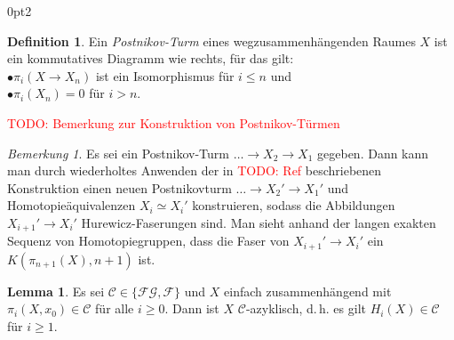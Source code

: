 \documentclass[11pt, a4paper, german]{article}
\theoremstyle{definition}
\newtheorem{lem}{Lemma}
\newtheorem{defn}{Definition}
\theoremstyle{remark}
\newtheorem*{bem}{Bemerkung}
\newcommand{\TODO}[1]{\textcolor{red}{TODO: #1}} %
\newcommand{\SC}{\mathcal{C}} %
\newcommand{\FG}{\mathcal{FG}} %
\newcommand{\F}{\mathcal{F}} %
\renewcommand{\dh}{d.\,h.} %
\newenvironment{centertikzcd}
  {\begin{center}\begin{tikzcd}}
  {\end{tikzcd}\end{center}}
\begin{document}
\renewcommand\windowpagestuff{
  \iffalse
  \begin{centertikzcd}[ampersand replacement=\&, column sep=0.5cm, row sep=0.2cm]
    \& \vdots \arrow[d] \\
    \& X_3 \arrow[d] \\
    \& X_2 \arrow[d] \\
    X \arrow[r] \arrow[ru] \arrow[ruu] \& X_1
  \end{centertikzcd}
  \fi
  \vspace{1cm}
  \begin{centertikzcd}[ampersand replacement=\&, column sep=0.2cm, row sep=0.5cm]
    \&\&\& X \arrow[dll] \arrow[dl] \arrow[d] \\
    \dots \arrow[r] \&
    X_3 \arrow[r] \&
    X_2 \arrow[r] \&
    X_1
  \end{centertikzcd}
}
\opencutright
\begin{cutout}{0}{\dimexpr\linewidth-4.5cm\relax}{0pt}{2}
  \begin{defn}
    Ein \emph{Postnikov-Turm} eines wegzusammenhängenden Raumes $X$ ist ein kommutatives Diagramm wie rechts, für das gilt: \\[3pt]
    \quad$\bullet$\enspace $\pi_i(X \to X_n)$ ist ein Isomorphismus für $i \leq n$ und \\
    \quad$\bullet$\enspace $\pi_i(X_n) = 0$ für $i > n$.
  \end{defn}
\end{cutout}

\TODO{Bemerkung zur Konstruktion von Postnikov-Türmen}

\begin{bem}
  Es sei ein Postnikov-Turm $\ldots \to X_2 \to X_1$ gegeben.
  Dann kann man durch wiederholtes Anwenden der in \TODO{Ref} beschriebenen Konstruktion einen neuen Postnikovturm $\ldots \to X_2' \to X_1'$ und Homotopieäquivalenzen $X_i \simeq X_i'$ konstruieren, sodass die Abbildungen $X_{i+1}' \to X_i'$ Hurewicz-Faserungen sind.
  Man sieht anhand der langen exakten Sequenz von Homotopiegruppen, dass die Faser von $X_{i+1}' \to X_i'$ ein $K(\pi_{n+1}(X), n{+}1)$ ist.
\end{bem}

\begin{lem}\label{homotopy-in-c-implies-homology-in-c}
  Es sei $\SC \in \{ \FG, \F \}$ und
  $X$ einfach zusammenhängend mit $\pi_i(X, x_0) \in \SC$ für alle $i \geq 0$.
  Dann ist $X$ $\SC$-azyklisch, \dh{} es gilt $H_i(X) \in \SC$ für $i \geq 1$.
\end{lem}
\end{document}
